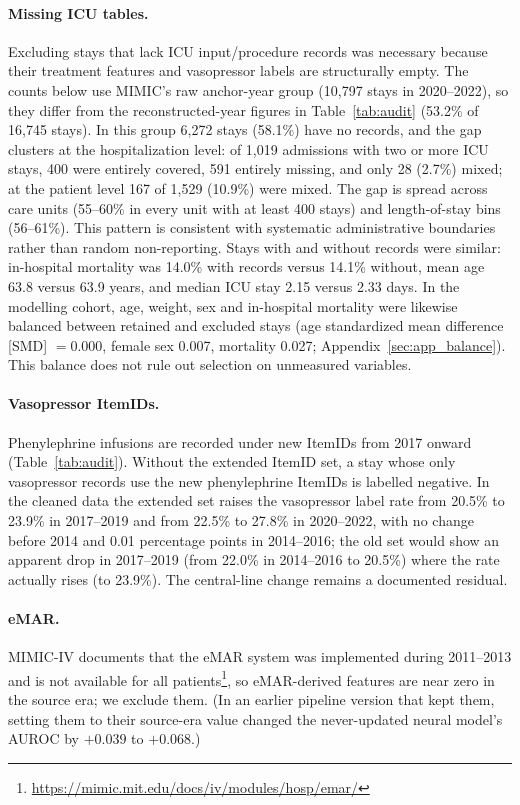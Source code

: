 \documentclass[10pt,a4paper,twocolumn]{article}
\begin{document}
	\paragraph{Missing ICU tables.} Excluding stays that lack ICU input/procedure records was necessary because their treatment features and vasopressor labels are structurally empty. The counts below use MIMIC's raw anchor-year group (10,797 stays in 2020--2022), so they differ from the reconstructed-year figures in Table~\ref{tab:audit} (53.2\% of 16,745 stays). In this group 6,272 stays (58.1\%) have no records, and the gap clusters at the hospitalization level: of 1,019 admissions with two or more ICU stays, 400 were entirely covered, 591 entirely missing, and only 28 (2.7\%) mixed; at the patient level 167 of 1,529 (10.9\%) were mixed. The gap is spread across care units (55--60\% in every unit with at least 400 stays) and length-of-stay bins (56--61\%). This pattern is consistent with systematic administrative boundaries rather than random non-reporting. Stays with and without records were similar: in-hospital mortality was 14.0\% with records versus 14.1\% without, mean age 63.8 versus 63.9 years, and median ICU stay 2.15 versus 2.33 days. In the modelling cohort, age, weight, sex and in-hospital mortality were likewise balanced between retained and excluded stays (age standardized mean difference [SMD] $= 0.000$, female sex 0.007, mortality 0.027; Appendix~\ref{sec:app_balance}). This balance does not rule out selection on unmeasured variables.
	
	\paragraph{Vasopressor ItemIDs.} Phenylephrine infusions are recorded under new ItemIDs from 2017 onward (Table~\ref{tab:audit}). Without the extended ItemID set, a stay whose only vasopressor records use the new phenylephrine ItemIDs is labelled negative. In the cleaned data the extended set raises the vasopressor label rate from 20.5\% to 23.9\% in 2017--2019 and from 22.5\% to 27.8\% in 2020--2022, with no change before 2014 and 0.01 percentage points in 2014--2016; the old set would show an apparent drop in 2017--2019 (from 22.0\% in 2014--2016 to 20.5\%) where the rate actually rises (to 23.9\%). The central-line change remains a documented residual.
	
	\paragraph{eMAR.} MIMIC-IV documents that the eMAR system was implemented during 2011--2013 and is not available for all patients\footnote{\url{https://mimic.mit.edu/docs/iv/modules/hosp/emar/}}, so eMAR-derived features are near zero in the source era; we exclude them. (In an earlier pipeline version that kept them, setting them to their source-era value changed the never-updated neural model's AUROC by $+0.039$ to $+0.068$.)
	
\end{document}
